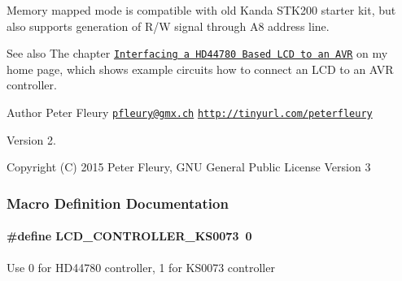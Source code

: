 Memory mapped mode is compatible with old Kanda S\+T\+K200 starter kit, but also supports generation of R/W signal through A8 address line.

\begin{DoxySeeAlso}{See also}
The chapter \href{ http://homepage.hispeed.ch/peterfleury/avr-lcd44780.html}{\tt Interfacing a H\+D44780 Based L\+CD to an A\+VR} on my home page, which shows example circuits how to connect an L\+CD to an A\+VR controller.
\end{DoxySeeAlso}
\begin{DoxyAuthor}{Author}
Peter Fleury \href{mailto:pfleury@gmx.ch}{\tt pfleury@gmx.\+ch} \href{http://tinyurl.com/peterfleury}{\tt http\+://tinyurl.\+com/peterfleury}
\end{DoxyAuthor}
\begin{DoxyVersion}{Version}
2.
\end{DoxyVersion}
\begin{DoxyCopyright}{Copyright}
(C) 2015 Peter Fleury, G\+NU General Public License Version 3 
\end{DoxyCopyright}


\subsubsection{Macro Definition Documentation}
\paragraph[{\texorpdfstring{L\+C\+D\+\_\+\+C\+O\+N\+T\+R\+O\+L\+L\+E\+R\+\_\+\+K\+S0073}{LCD_CONTROLLER_KS0073}}]{\setlength{\rightskip}{0pt plus 5cm}\#define L\+C\+D\+\_\+\+C\+O\+N\+T\+R\+O\+L\+L\+E\+R\+\_\+\+K\+S0073~0}\hypertarget{a00006_ga63574b03f72a197aeee823aae95dc3b7}{}\label{a00006_ga63574b03f72a197aeee823aae95dc3b7}
Use 0 for H\+D44780 controller, 1 for K\+S0073 controller 
